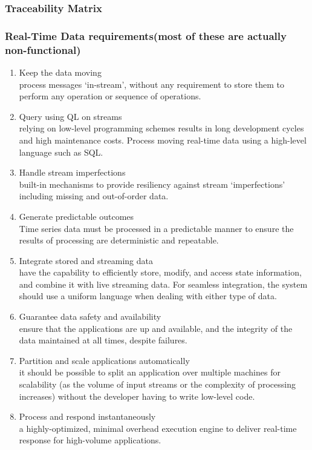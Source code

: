 \documentclass[12pt]{article}
\begin{document}
{{		\subsubsection{Traceability Matrix}
		\subsubsection{Real-Time Data requirements(most of these are actually non-functional)}
        	\begin{enumerate}
            	\item{Keep the data moving\\process messages ‘in-stream’, without any requirement to store them to perform any operation or sequence of operations.}
                \item{Query using QL on streams\\relying on low-level programming schemes results in long development cycles and high maintenance costs. Process moving real-time data using a high-level language such as SQL.}
                \item{Handle stream imperfections\\ built-in mechanisms to provide resiliency against stream ‘imperfections’ including missing and out-of-order data.}
                \item{Generate predictable outcomes\\Time series data must be processed in a predictable manner to ensure the results of processing are deterministic and repeatable.}
                \item{Integrate stored and streaming data\\have the capability to efficiently store, modify, and access state information, and combine it with live streaming data. For seamless integration, the system should use a uniform language when dealing with either type of data.}
                \item{Guarantee data safety and availability\\ ensure that the applications are up and available, and the integrity of the data maintained at all times, despite failures.}
                \item{Partition and scale applications automatically\\ it should be possible to split an application over multiple machines for scalability (as the volume of input streams or the complexity of processing increases) without the developer having to write low-level code.}
                \item{Process and respond instantaneously\\a highly-optimized, minimal overhead execution engine to deliver real-time response for high-volume applications.}
            \end{enumerate}
	    
}}
\end{document}
